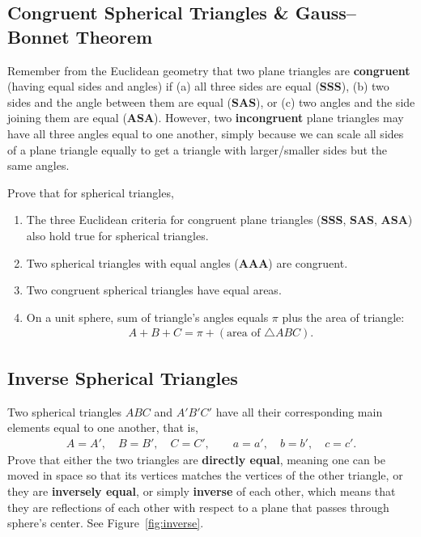 \documentclass[12pt,a4paper]{memoir}
\theoremstyle{definition}
\begin{document}
\subsection{Congruent Spherical Triangles \& Gauss--Bonnet Theorem}
Remember from the Euclidean geometry that two plane triangles are \textbf{congruent} (having equal sides and angles) if (a) all three sides are equal (\textbf{SSS}), (b) two sides and the angle between them are equal (\textbf{SAS}), or (c) two angles and the side joining them are equal (\textbf{ASA}). However, two \textbf{incongruent} plane triangles may have all three angles equal to one another, simply because we can scale all sides of a plane triangle equally to get a triangle with larger/smaller sides but the same angles.
	\begin{question}
		 Prove that for spherical triangles,
		\begin{enumerate}
			\item The three Euclidean criteria for congruent plane triangles (\textbf{SSS}, \textbf{SAS}, \textbf{ASA}) also hold true for spherical triangles.
			\item Two spherical triangles with equal angles (\textbf{AAA}) are congruent.
			\item Two congruent spherical triangles have equal areas.
			\item On a unit sphere, sum of triangle's angles equals $\pi$ plus the area of triangle:
			\begin{align*}
				A + B + C = \pi + (\text{area of }\triangle ABC).
			\end{align*}
		\end{enumerate}
	\end{question}


\subsection{Inverse Spherical Triangles}
	\begin{question}
		Two spherical triangles $ABC$ and $A'B'C'$ have all their corresponding main elements equal to one another, that is,
		\begin{align*}
			A= A', \quad B=B',\quad C=C', \qquad
			a=a', \quad b=b',\quad c=c'.
		\end{align*}
		Prove that either the two triangles are \textbf{directly equal}, meaning one can be moved in space so that its vertices matches the vertices of the other triangle, or they are \textbf{inversely equal}, or simply \textbf{inverse} of each other, which means that they are reflections of each other with respect to a plane that passes through sphere's center. See Figure~\ref{fig:inverse}.
	\end{question}
\end{document}
